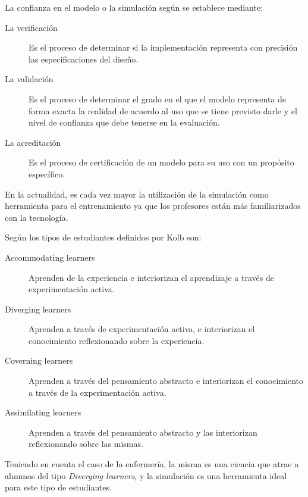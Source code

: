 La confianza en el modelo o la simulación según\cite{DoDSysEng2001} se establece
mediante:

\begin{description}

\item[La verificación] Es el proceso de determinar si la implementación
	representa con precisión las especificaciones del diseño. 

\item[La validación] Es el proceso de determinar el grado en el que el modelo
	representa de forma exacta la realidad de acuerdo al uso que se tiene
	previsto darle y el nivel de confianza que debe tenerse en la
	evaluación.

\item[La acreditación] Es el proceso de certificación de un modelo para su uso
	con un propósito específico.

\end{description}

En la actualidad, es cada vez mayor la utilización de la simulación como
herramienta para el entrenamiento ya que los profesores están más familiarizados
con la tecnología. 

Según\cite{humphreys2013developing} los tipos de estudiantes definidos por Kolb
son:

\begin{description}

\item[Accommodating learners] Aprenden de la experiencia e interiorizan el
	aprendizaje a través de experimentación activa. 

\item[Diverging learners] Aprenden a través de experimentación activa, e
	interiorizan el conocimiento reflexionando sobre la experiencia. 

\item[Coverning learners] Aprenden a través del pensamiento abstracto e
	interiorizan el conocimiento a través de la experimentación activa.

\item[Assimilating learners] Aprenden a través del pensamiento abstracto y las
	interiorizan reflexionando sobre las mismas. 
	
\end{description}

Teniendo en cuenta el caso de la enfermería, la misma es una ciencia que atrae a
alumnos del tipo \emph{Diverging learners}, y la simulación es una herramienta
ideal para este tipo de estudiantes.

